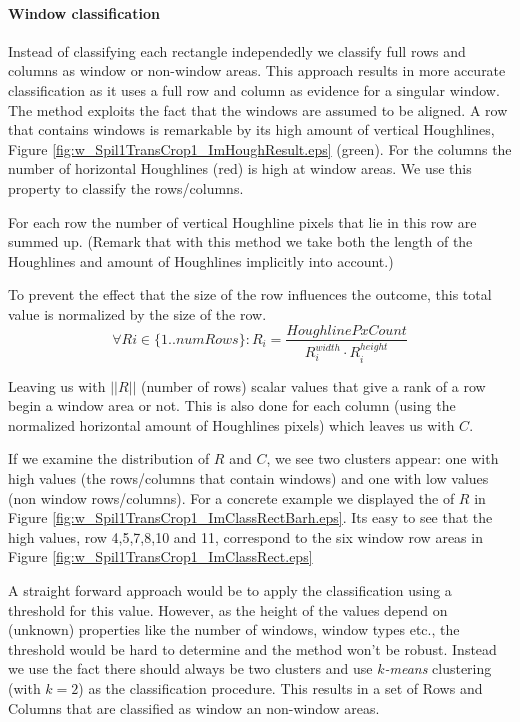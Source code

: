 \paragraph{Window classification}
Instead of classifying each rectangle independedly we classify full rows and
columns as window or non-window areas.  This approach results in more accurate
classification as it uses a full row and column as evidence for a singular
window. The method exploits the fact that the windows are assumed to be
aligned.
A row that contains windows is remarkable by its high amount of vertical
Houghlines, Figure \ref{fig:w_Spil1TransCrop1_ImHoughResult.eps}
(green). For the columns the number of horizontal Houghlines
 (red) is high at window areas.  We use this property to classify 
 the rows/columns. 

For each row the number of vertical Houghline pixels that lie in this row are summed up.
(Remark that with this method we take both the length of the Houghlines and amount of Houghlines 
implicitly into account.)

To prevent the effect that the size of the row influences the outcome, this total value
is normalized by the size of the row.
\[\forall Ri\in \{1..numRows\} : R_i = \frac{HoughlinePxCount}{R_i^{width} \cdot R_i^{height}}\]

Leaving us with $||R||$ (number of rows) scalar values that give a rank of a row begin a window area or not.
This is also done for each column (using the normalized horizontal amount of
Houghlines pixels) which leaves us with $C$.

If we examine the distribution of $R$ and $C$, we see two clusters appear: one with
high values (the rows/columns that contain windows) and one with low values (non window
rows/columns). For a concrete example we displayed the of $R$ in Figure \ref{fig:w_Spil1TransCrop1_ImClassRectBarh.eps}.
Its easy to see that the high values, row 4,5,7,8,10 and 11, correspond to the
six window row areas in Figure \ref{fig:w_Spil1TransCrop1_ImClassRect.eps} 

A straight forward approach would be to apply the classification using a
threshold for this value.  However, as the height of the values depend on
(unknown) properties like the number of windows, window types etc., the threshold
would be hard to determine and the method won't be robust. Instead we use the fact 
there should always be two clusters and use \emph{$k$-means}
clustering (with $k=2$) as the classification procedure.
This results in a set of Rows and Columns that are classified as window an
non-window areas.

